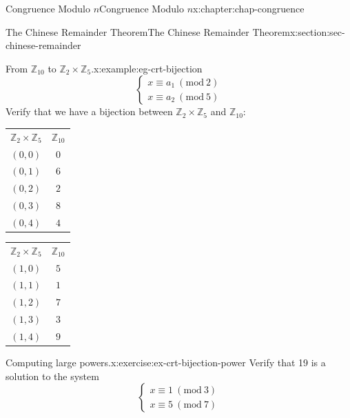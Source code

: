 \documentclass[oneside,10pt,]{book}
\newcommand{\tabularfont}{\relax}
\numberwithin{equation}{section}
\newcommand{\Mod}[1]{\ \left(\mathrm{mod}\ #1\right)}
\begin{document}
\begin{chapterptx}{Congruence Modulo \(n\)}{}{Congruence Modulo \(n\)}{}{}{x:chapter:chap-congruence}
\begin{sectionptx}{The Chinese Remainder Theorem}{}{The Chinese Remainder Theorem}{}{}{x:section:sec-chinese-remainder}
\begin{example}{From \(\mathbb{Z}_{10}\) to \(\mathbb{Z}_2 \times \mathbb{Z}_5\).}{x:example:eg-crt-bijection}
\begin{equation*}
\begin{cases} x \equiv a_1 \Mod{2} \\ x \equiv a_2 \Mod{5}\end{cases}
\end{equation*}
Verify that we have a bijection between \(\mathbb{Z}_2 \times \mathbb{Z}_5\) and \(\mathbb{Z}_{10}\):%
\begin{sidebyside}{2}{0.15}{0.15}{0.1}%
\begin{sbspanel}{0.3}%
{\centering%
{\tabularfont%
\begin{tabular}{ll}
\multicolumn{1}{c}{\(\mathbb{Z}_2 \times \mathbb{Z}_5\)}&\multicolumn{1}{c}{\(\mathbb{Z}_{10}\)}\tabularnewline[0pt]
\multicolumn{1}{c}{\((0,0)\)}&\multicolumn{1}{c}{\(0\)}\tabularnewline[0pt]
\multicolumn{1}{c}{\((0,1)\)}&\multicolumn{1}{c}{\(6\)}\tabularnewline[0pt]
\multicolumn{1}{c}{\((0,2)\)}&\multicolumn{1}{c}{\(2\)}\tabularnewline[0pt]
\multicolumn{1}{c}{\((0,3)\)}&\multicolumn{1}{c}{\(8\)}\tabularnewline[0pt]
\multicolumn{1}{c}{\((0,4)\)}&\multicolumn{1}{c}{\(4\)}
\end{tabular}
}%
\par}
\end{sbspanel}%
\begin{sbspanel}{0.3}%
{\centering%
{\tabularfont%
\begin{tabular}{ll}
\multicolumn{1}{c}{\(\mathbb{Z}_2 \times \mathbb{Z}_5\)}&\multicolumn{1}{c}{\(\mathbb{Z}_{10}\)}\tabularnewline[0pt]
\multicolumn{1}{c}{\((1,0)\)}&\multicolumn{1}{c}{\(5\)}\tabularnewline[0pt]
\multicolumn{1}{c}{\((1,1)\)}&\multicolumn{1}{c}{\(1\)}\tabularnewline[0pt]
\multicolumn{1}{c}{\((1,2)\)}&\multicolumn{1}{c}{\(7\)}\tabularnewline[0pt]
\multicolumn{1}{c}{\((1,3)\)}&\multicolumn{1}{c}{\(3\)}\tabularnewline[0pt]
\multicolumn{1}{c}{\((1,4)\)}&\multicolumn{1}{c}{\(9\)}
\end{tabular}
}%
\par}
\end{sbspanel}%
\end{sidebyside}%
\end{example}
\begin{inlineexercise}{Computing large powers.}{x:exercise:ex-crt-bijection-power}%
Verify that 19 is a solution to the system%
\begin{equation*}
\begin{cases} x \equiv 1 \Mod{3} \\ x \equiv 5 \Mod{7}\end{cases}
\end{equation*}
%
\par

\end{inlineexercise}
\end{sectionptx}
\end{chapterptx}
\end{document}
